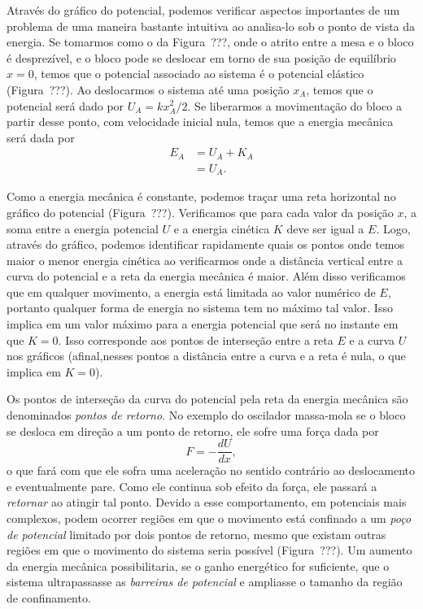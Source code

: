 Através do gráfico do potencial, podemos verificar aspectos importantes de um problema de uma maneira bastante intuitiva ao analisa-lo sob o ponto de vista da energia. Se tomarmos como o da Figura~???, onde o atrito entre a mesa e o bloco é desprezível, e o bloco pode se deslocar em torno de sua posição de equilíbrio $x = 0$, temos que o potencial associado ao sistema é o potencial elástico (Figura~???). Ao deslocarmos o sistema até uma posição $x_A$, temos que o potencial será dado por $U_A = kx_A^2 /2$. Se liberarmos a movimentação do bloco a partir desse ponto, com velocidade inicial nula, temos que a energia mecânica será dada por
\begin{align}
  E_A &= U_A + K_A \\
  &= U_A.
\end{align}

Como a energia mecânica é constante, podemos traçar uma reta horizontal no gráfico do potencial (Figura~???). Verificamos que para cada valor da posição $x$, a soma entre a energia potencial $U$ e a energia cinética $K$ deve ser igual a $E$. Logo, através do gráfico, podemos identificar rapidamente quais os pontos onde temos maior o menor energia cinética ao verificarmos onde a distância vertical entre a curva do potencial e a reta da energia mecânica é maior. Além disso verificamos que em qualquer movimento, a energia está limitada ao valor numérico de $E$, portanto qualquer forma de energia no sistema tem no máximo tal valor. Isso implica em um valor máximo para a energia potencial que será no instante em que $K = 0$. Isso corresponde aos pontos de interseção entre a reta $E$ e a curva $U$ nos gráficos (afinal,nesses pontos a distância entre a curva e a reta é nula, o que implica em $K=0$).

Os pontos de interseção da curva do potencial pela reta da energia mecânica são denominados \emph{pontos de retorno}. No exemplo do oscilador massa-mola se o bloco se desloca em direção a um ponto de retorno, ele sofre uma força dada por
\begin{equation}
  F = -\frac{dU}{dx},
\end{equation}
%
o que fará com que ele sofra uma aceleração no sentido contrário ao deslocamento e eventualmente pare. Como ele continua sob efeito da força, ele passará a \emph{retornar} ao atingir tal ponto. Devido a esse comportamento, em potenciais mais complexos, podem ocorrer regiões em que o movimento está confinado a um \emph{poço de potencial} limitado por dois pontos de retorno, mesmo que existam outras regiões em que o movimento do sistema seria possível (Figura~???). Um aumento da energia mecânica possibilitaria, se o ganho energético for suficiente, que o sistema ultrapassasse as \emph{barreiras de potencial} e ampliasse o tamanho da região de confinamento.

